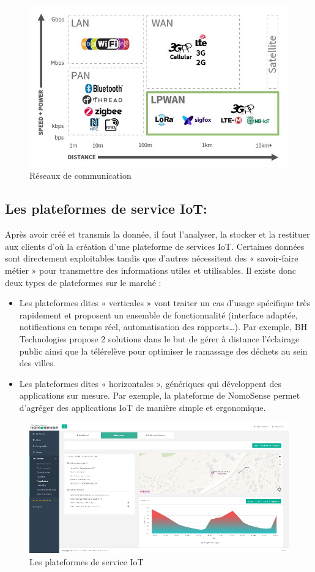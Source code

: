 \begin{figure}[h]
	\centering
    \includegraphics[scale=0.4]{img/part1/2.5}
    \caption{Réseaux de communication }
\end{figure}

\subsection{Les plateformes de service IoT:}
Après avoir créé et transmis la donnée, il faut l’analyser, la stocker et la restituer aux clients d’où la création d’une plateforme de services IoT. Certaines données sont directement exploitables tandis que d’autres nécessitent des « savoir-faire métier » pour transmettre des informations utiles et utilisables. Il existe donc deux types de plateformes sur le marché :
\begin{itemize}[label=\textbullet]
\item Les plateformes dites « verticales » vont traiter un cas d’usage spécifique très rapidement et proposent un ensemble de fonctionnalité (interface adaptée, notifications en temps réel, automatisation des rapports…). Par exemple, BH Technologies propose 2 solutions dans le but de gérer à distance l’éclairage public ainsi que la télérelève pour optimiser le ramassage des déchets au sein des villes.
\item Les plateformes dites « horizontales », génériques qui développent des applications sur mesure. Par exemple, la plateforme de NomoSense permet d’agréger des applications IoT de manière simple et ergonomique.
\end{itemize}

\begin{figure}[h]
	\centering
    \includegraphics[scale=0.9]{img/part1/2.6}
    \caption{Les plateformes de service IoT}
\end{figure}